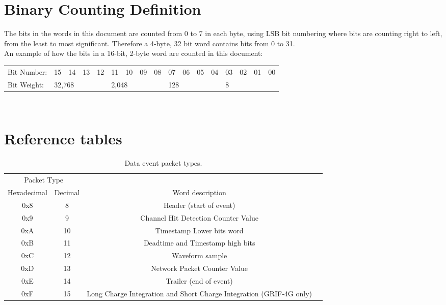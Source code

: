 \documentclass[letterpaper,12pt,notitlepage]{report}
\begin{document}
\newpage
\section{Binary Counting Definition}

The bits in the words in this document are counted from 0 to 7 in each byte, using LSB bit numbering where bits are counting right to left, from the least to most significant. Therefore a 4-byte, 32 bit word contains bits from 0 to 31.\\

An example of how the bits in a 16-bit, 2-byte word are counted in this document:\\

\begin{tabular}{l|cccc|cccc|cccc|cccc|}
Bit Number: & 15 & 14 & 13 & 12 & 11 & 10 & 09 & 08 & 07 & 06 & 05 & 04 & 03 & 02 & 01 & 00\\
Bit Weight: & \multicolumn{4}{l}{32,768} & \multicolumn{4}{|l}{2,048} &\multicolumn{4}{|l}{128} &\multicolumn{4}{|l|}{8}\\
\end{tabular}\\

\newpage
\section{Reference tables}
\label{sec.tables}

\begin{table}[h]
\begin{center}
\begin{tabular}{cccc}
\hline
\hline
\multicolumn{2}{c}{Packet Type} & \\
Hexadecimal & Decimal & Word description\\
\hline
0x8 & 8 & Header (start of event)\\
0x9 & 9 &  Channel Hit Detection Counter Value\\
0xA & 10 & Timestamp Lower bits word\\
0xB & 11 & Deadtime and Timestamp high bits\\
0xC & 12 & Waveform sample\\
0xD & 13 & Network Packet Counter Value\\
0xE & 14 & Trailer (end of event)\\
0xF & 15 & Long Charge Integration and Short Charge Integration (GRIF-4G only)\\
\hline
\hline
\end{tabular}
\label{table.packettypes_data}
\caption{Data event packet types.}
\end{center}
\end{table}
\end{document}
